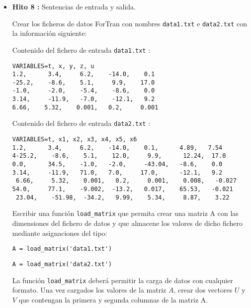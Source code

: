 \documentclass[12pt,spanish]{article}
\begin{document}
\begin{itemize}
\newpage 

\item {\bf Hito 8 :}   Sentencias de entrada y salida.

\vspace{0.5cm}    

Crear los ficheros de datos ForTran con nombres  \verb|data1.txt| e 
\verb|data2.txt| con la información siguiente:

\vspace{1cm}

Contenido del fichero de entrada \verb|data1.txt| :

\begin{verbatim}
VARIABLES=t, x, y, z, u
1.2,      3.4,     6.2,    -14.0,    0.1
-25.2,    -8.6,    5.1,     9.9,    17.0
-1.0,     -2.0,    -5.4,    -8.6,    0.0
3.14,     -11.9,   -7.0,    -12.1,   9.2
6.66,    5.32,    0.001,   0.2,     0.001
\end{verbatim}

\vspace{1cm}

Contenido del fichero de entrada \verb|data2.txt| :

\begin{verbatim}
VARIABLES=t, x1, x2, x3, x4, x5, x6
1.2,      3.4,     6.2,    -14.0,    0.1,      4.89,   7.54
4-25.2,    -8.6,    5.1,    12.0,     9.9,      12.24,  17.0
0.0,      34.5,    -1.0,   -2.0,     -43.04,   -8.6,    0.0
3.14,     -11.9,   71.0,   7.0,     17.0,      -12.1,   9.2
 6.66,     5.32,    0.001,   0.2,     0.001,    0.008,   -0.027
54.0,     77.1,    -9.002,  -13.2,   0.017,    65.53,   -0.021
 23.04,    -51.98,  -34.2,   9.99,    5.34,     8.87,    3.22 
\end{verbatim}

\vspace{0.5cm}


Escribir una función \verb|load_matrix| que permita crear una matriz A con las dimensiones 
del fichero de datos y que almacene los valores de dicho fichero mediante 
 asignaciones del tipo: 
 
 \hspace{2cm} \verb|A = load_matrix('data1.txt')| 
 
 \hspace{2cm}  \verb|A = load_matrix('data2.txt')|

La función   \verb|load_matrix| deberá permitir la carga de datos con cualquier formato. 
Una vez cargados los valores de la matriz $ A $, crear dos vectores $ U$ y $V$  que contengan la primera y segunda columnas de la matriz A. 
     


\end{itemize}
\end{document}
